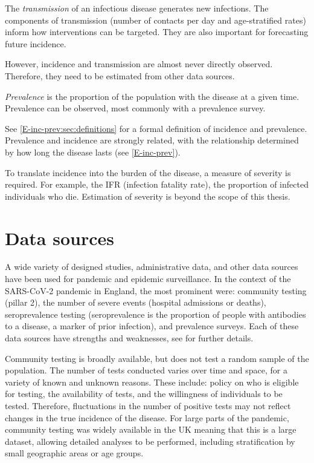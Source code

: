 \documentclass[thesis.tex]{subfiles}
\begin{document}
The \emph{transmission} of an infectious disease generates new infections.
The components of transmission (\eg number of contacts per day and age-stratified rates) inform how interventions can be targeted.
They are also important for forecasting future incidence.

However, incidence and transmission are almost never directly observed.
Therefore, they need to be estimated from other data sources.

\emph{Prevalence} is the proportion of the population with the disease at a given time.
Prevalence can be observed, most commonly with a prevalence survey.

See \cref{E-inc-prev:sec:definitions} for a formal definition of incidence and prevalence.
Prevalence and incidence are strongly related, with the relationship determined by how long the disease lasts (see \cref{E-inc-prev}).

To translate incidence into the burden of the disease, a measure of severity is required.
For example, the IFR (infection fatality rate), the proportion of infected individuals who die.
Estimation of severity is beyond the scope of this thesis.

\section{Data sources} \label{intro:sec:data-sources}

A wide variety of designed studies, administrative data, and other data sources have been used for pandemic and epidemic surveillance.
In the context of the SARS-CoV-2 pandemic in England, the most prominent were: community testing (pillar 2), the number of severe events (\eg hospital admissions or deaths), seroprevalence testing (seroprevalence is the proportion of people with antibodies to a disease, a marker of prior infection), and prevalence surveys.
Each of these data sources have strengths and weaknesses, see \textcite{royalSocietyRnumber} for further details.

Community testing is broadly available, but does not test a random sample of the population.
The number of tests conducted varies over time and space, for a variety of known and unknown reasons.
These include: policy on who is eligible for testing, the availability of tests, and the willingness of individuals to be tested.
Therefore, fluctuations in the number of positive tests may not reflect changes in the true incidence of the disease.
For large parts of the pandemic, community testing was widely available in the UK meaning that this is a large dataset, allowing detailed analyses to be performed, including stratification by small geographic areas or age groups.
\end{document}
